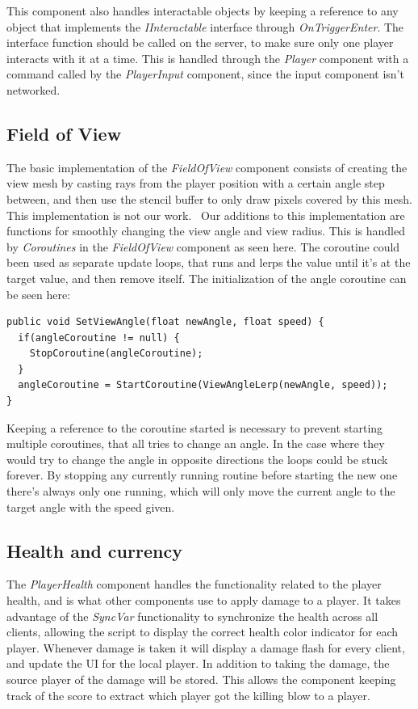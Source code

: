 
This component also handles interactable objects by keeping a reference to any object that implements the \emph{IInteractable} interface through \emph{OnTriggerEnter}. The interface function should be called on the server, to make sure only one player interacts with it at a time. This is handled through the \emph{Player} component with a command called by the \emph{PlayerInput} component, since the input component isn't networked.

\subsection{Field of View}
\label{sec:fieldOfView}
The basic implementation of the \emph{FieldOfView} component consists of creating the view mesh by casting rays from the player position with a certain angle step between, and then use the stencil buffer to only draw pixels covered by this mesh. This implementation is not our work.~\cite{fieldOfViewGitHub}
Our additions to this implementation are functions for smoothly changing the view angle and view radius. This is handled by \emph{Coroutines} in the \emph{FieldOfView} component as seen here. The coroutine could been used as separate update loops, that runs and lerps the value until it's at the target value, and then remove itself. The initialization of the angle coroutine can be seen here:

\begin{verbatim}
public void SetViewAngle(float newAngle, float speed) {
  if(angleCoroutine != null) {
    StopCoroutine(angleCoroutine);
  }
  angleCoroutine = StartCoroutine(ViewAngleLerp(newAngle, speed));
}
\end{verbatim}

Keeping a reference to the coroutine started is necessary to prevent starting multiple coroutines, that all tries to change an angle. In the case where they would try to change the angle in opposite directions the loops could be stuck forever. By stopping any currently running routine before starting the new one there's always only one running, which will only move the current angle to the target angle with the speed given.
    
\subsection{Health and currency}
The \emph{PlayerHealth} component handles the functionality related to the player health, and is what other components use to apply damage to a player. It takes advantage of the \emph{SyncVar} functionality to synchronize the health across all clients, allowing the script to display the correct health color indicator for each player. Whenever damage is taken it will display a damage flash for every client, and update the UI for the local player. In addition to taking the damage, the source player of the damage will be stored. This allows the component keeping track of the score to extract which player got the killing blow to a player.
    
